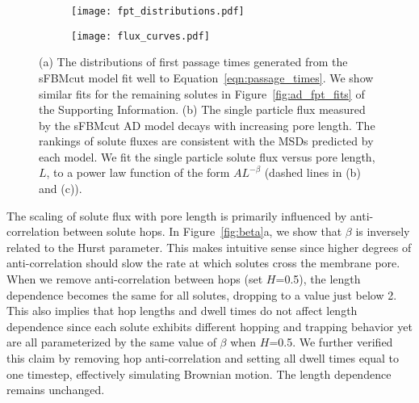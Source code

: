 \documentclass[journal=ancac3,manuscript=article,layout=twocolumn]{achemso}
\begin{document}
  \begin{figure*}
  \centering
  \begin{subfigure}{0.485\textwidth}
  \texttt{[image: fpt\_distributions.pdf]}
  \caption{}\label{fig:fpt_distributions}
  \end{subfigure}
  \begin{subfigure}{0.485\textwidth}
  \texttt{[image: flux\_curves.pdf]}
  \caption{}\label{fig:flux_curves_ad}
  \end{subfigure}
  \caption{(a) The distributions of first passage times generated from the
	  sFBMcut model fit well to Equation~\ref{eqn:passage_times}. We show
	  similar fits for the remaining solutes in
	  Figure~\ref{fig:ad_fpt_fits} of the Supporting Information. (b) The
	  single particle flux measured by the sFBMcut AD model decays with
	  increasing pore length. The rankings of solute fluxes are consistent
	  with the MSDs predicted by each model. We fit the single particle
	  solute flux versus pore length, $L$, to a power law function of the
	  form $AL^{-\beta}$ (dashed lines in (b) and (c)). 
  }\label{fig:flux_curves}
  \end{figure*}

  The scaling of solute flux with pore length is primarily influenced by
  anti-correlation between solute hops. In Figure~\ref{fig:beta}a, we show that
  $\beta$ is inversely related to the Hurst parameter. This makes intuitive
  sense since higher degrees of anti-correlation should slow the rate at which
  solutes cross the membrane pore. When we remove anti-correlation between
  hops (set $H$=0.5), the length dependence becomes the same for all solutes,
  dropping to a value just below 2. This also implies that hop lengths and
  dwell times do not affect length dependence since each solute exhibits
  different hopping and trapping behavior yet are all parameterized by the same
  value of $\beta$ when $H$=0.5. We further verified this claim by removing
  hop anti-correlation and setting all dwell times equal to one timestep,
  effectively simulating Brownian motion.  The length dependence remains
  unchanged. 
\end{document}
